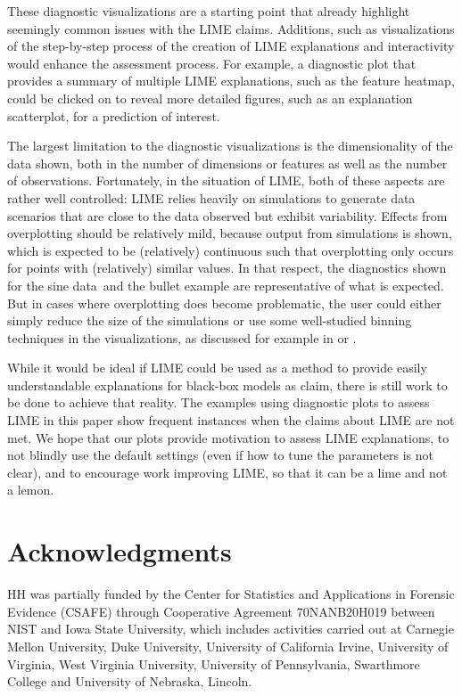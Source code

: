 \documentclass[AMS,STIX2COL]{WileyNJD-v2}\usepackage[]{graphicx}\usepackage[]{color}
\newcommand{\data}{sine data}
\begin{document}
These diagnostic visualizations are a starting point that already highlight seemingly common issues with the LIME claims. Additions, such as visualizations of the step-by-step process of the creation of LIME explanations and interactivity would enhance the assessment process. For example, a diagnostic plot that provides a summary of multiple LIME explanations, such as the feature heatmap, could be clicked on to reveal more detailed figures, such as an explanation scatterplot, for a prediction of interest.

The largest limitation to the diagnostic visualizations is the dimensionality of the data shown, both in the number of dimensions or features as well as the number of observations. Fortunately, in the situation of LIME, both of these aspects are rather well controlled: LIME relies heavily on simulations to generate data scenarios that are close to the data observed but exhibit variability. Effects from overplotting should be relatively mild, because output from simulations is shown, which is expected to be (relatively) continuous such that overplotting only occurs for points with (relatively) similar values. In that respect, the diagnostics shown for the \data \ and the bullet example are representative of what is expected. But in cases where overplotting does become problematic, the user could either simply reduce the size of the simulations or use some well-studied binning techniques in the visualizations, as discussed for example in \citet{carr:1987} or \citet{unwin:2006}. 

While it would be ideal if LIME could be used as a method to provide easily understandable explanations for black-box models as \citet{ribeiro:2016} claim, there is still work to be done to achieve that reality. The examples using diagnostic plots to assess LIME in this paper show frequent instances when the claims about LIME are not met. We hope that our plots provide motivation to assess LIME explanations, to not blindly use the default settings (even if how to tune the parameters is not clear), and to encourage work improving LIME, so that it can be a lime and not a lemon.

\section*{Acknowledgments}

HH was partially funded by the Center for Statistics and Applications in Forensic Evidence (CSAFE) through Cooperative Agreement 70NANB20H019 between NIST and Iowa State University, which includes activities carried out at Carnegie Mellon University, Duke University, University of California Irvine, University of Virginia, West Virginia University, University of Pennsylvania, Swarthmore College and University of Nebraska, Lincoln.
\end{document}
